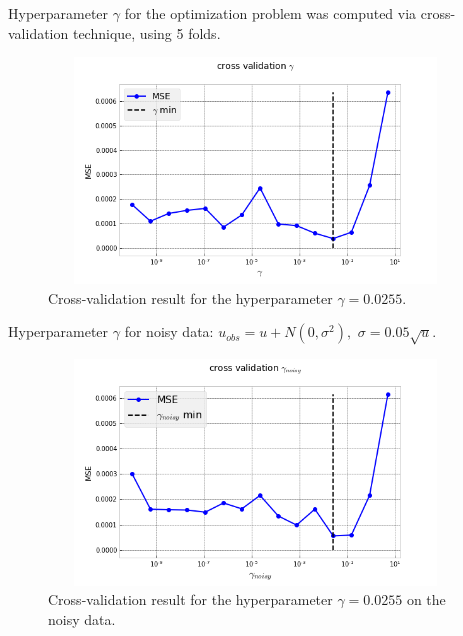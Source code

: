 \documentclass{beamer}
\begin{document}
\begin{frame}

Hyperparameter $\gamma$ for the optimization problem was computed via cross-validation technique, using 5 folds. 
\begin{figure}
    \centering
    \includegraphics[width=11cm, height=6cm]{images/burgers-cross_val_gamma.png}
    \caption{Cross-validation result for the hyperparameter $\gamma = 0.0255$.}
    \label{fig:cross_val_gamma}
\end{figure}

\end{frame}

\begin{frame}

Hyperparameter $\gamma$ for noisy data: $u_{obs} = u + N(0, \sigma^2),$ $\sigma = 0.05\sqrt{u}.$ 

\begin{figure}
    \centering
    \includegraphics[width=11cm, height=6cm]{images/burgers-cross_val_gamma_noisy.png}
    \caption{Cross-validation result for the hyperparameter $\gamma = 0.0255$ on the noisy data.}
    \label{fig:cross_val_gamma_noisy}
\end{figure}
    
\end{frame}
\end{document}
